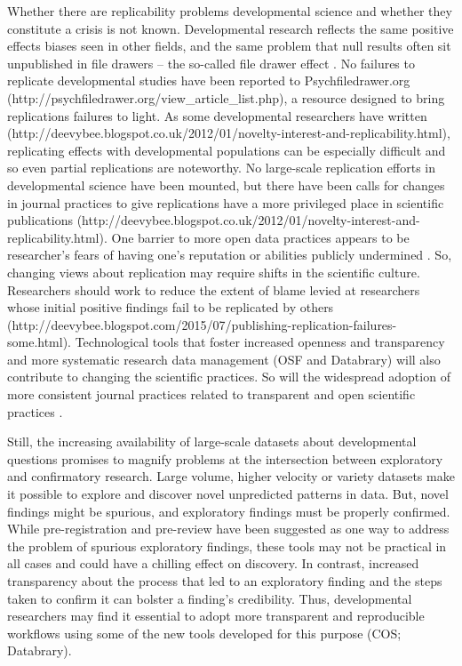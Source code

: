 \documentclass[letterpaper,man,apacite]{apa6}
\begin{document}
Whether there are replicability problems developmental science and whether they constitute a crisis is not known.
Developmental research reflects the same positive effects biases seen in other fields, and the same problem that null results often sit unpublished in file drawers -- the so-called file drawer effect \cite{rosenthal_file_1979}.
No failures to replicate developmental studies have been reported to Psychfiledrawer.org (http://psychfiledrawer.org/view_article_list.php), a resource designed to bring replications failures to light.
As some developmental researchers have written (http://deevybee.blogspot.co.uk/2012/01/novelty-interest-and-replicability.html), replicating effects with developmental populations can be especially difficult and so even partial replications are noteworthy.
No large-scale replication efforts in developmental science have been mounted, but there have been calls for changes in journal practices to give replications have a more privileged place in scientific publications (http://deevybee.blogspot.co.uk/2012/01/novelty-interest-and-replicability.html).
One barrier to more open data practices appears to be researcher's fears of having one's reputation or abilities publicly undermined \cite{ascoli_ups_2006}.
So, changing views about replication may require shifts in the scientific culture.
Researchers should work to reduce the extent of blame levied at researchers whose initial positive findings fail to be replicated by others (http://deevybee.blogspot.com/2015/07/publishing-replication-failures-some.html).
Technological tools that foster increased openness and transparency and more systematic research data management (OSF and Databrary) will also contribute to changing the scientific practices.
So will the widespread adoption of more consistent journal practices related to transparent and open scientific practices \cite{nosek_promoting_2015}.

Still, the increasing availability of large-scale datasets about developmental questions promises to magnify problems at the intersection between exploratory and confirmatory research.
Large volume, higher velocity or variety datasets make it possible to explore and discover novel unpredicted patterns in data.
But, novel findings might be spurious, and exploratory findings must be properly confirmed.
While pre-registration and pre-review have been suggested as one way to address the problem of spurious exploratory findings, these tools may not be practical in all cases and could have a chilling effect on discovery.
In contrast, increased transparency about the process that led to an exploratory finding and the steps taken to confirm it can bolster a finding's credibility.
Thus, developmental researchers may find it essential to adopt more transparent and reproducible workflows using some of the new tools developed for this purpose (COS; Databrary).
\end{document}
